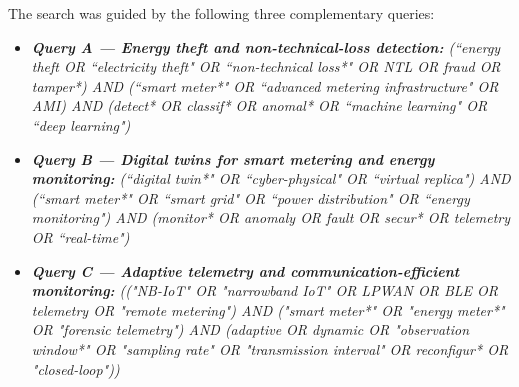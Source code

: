 \documentclass[journal]{IEEEtran}
\begin{document}
The search was guided by the following three complementary queries:
\begin{itemize}
    \item \textit{\textbf{Query A --- Energy theft and non-technical-loss detection:} (``energy theft OR ``electricity theft" OR ``non-technical loss*" OR NTL OR fraud OR tamper*) AND (``smart meter*" OR ``advanced metering infrastructure" OR AMI) AND (detect* OR classif* OR anomal* OR ``machine learning" OR ``deep learning")}
    \item \textit{\textbf{Query B --- Digital twins for smart metering and energy monitoring:} (``digital twin*" OR ``cyber-physical" OR ``virtual replica") AND (``smart meter*" OR ``smart grid" OR ``power distribution" OR ``energy monitoring") AND (monitor* OR anomaly OR fault OR secur* OR telemetry OR ``real-time")}
    \item \textit{\textbf{Query C --- Adaptive telemetry and communication-efficient monitoring:} (("NB-IoT" OR "narrowband IoT" OR LPWAN OR BLE OR telemetry OR "remote metering") AND ("smart meter*" OR "energy meter*" OR "forensic telemetry") AND (adaptive OR dynamic OR "observation window*" OR "sampling rate" OR "transmission interval" OR reconfigur* OR "closed-loop"))}
\end{itemize}



\end{document}
